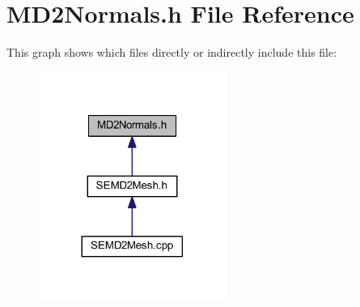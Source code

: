 \section{M\+D2\+Normals.\+h File Reference}
\label{_m_d2_normals_8h}
This graph shows which files directly or indirectly include this file\+:
\nopagebreak
\begin{figure}[H]
\begin{center}
\leavevmode
\includegraphics[width=173pt]{_m_d2_normals_8h__dep__incl}
\end{center}
\end{figure}
